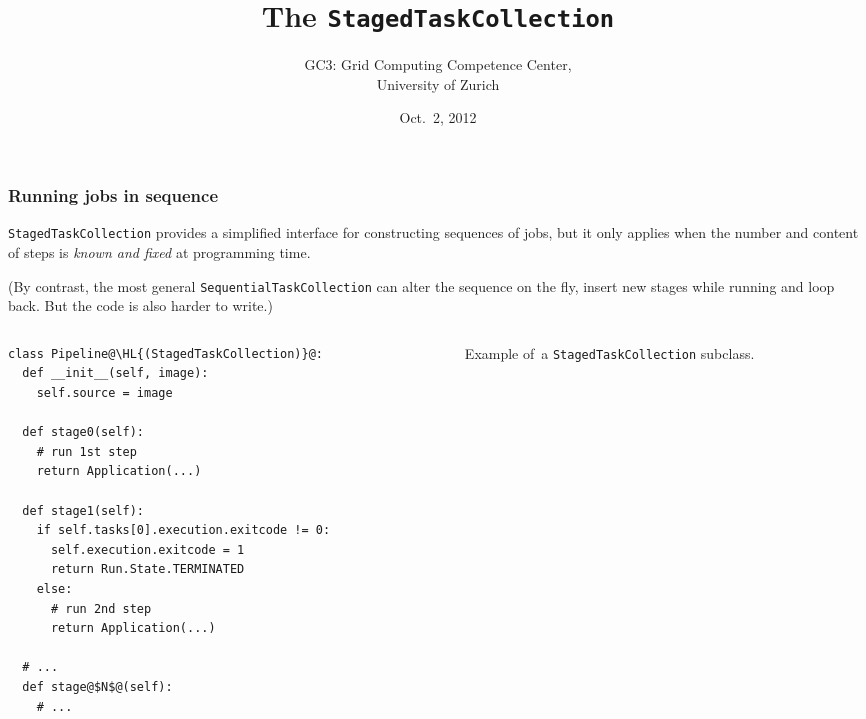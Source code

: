 \documentclass[english,serif,mathserif,xcolor=pdftex,dvipsnames,table]{beamer}
\title{%
  The \texttt{StagedTaskCollection}
}
\author[Riccardo Murri]{%
  GC3: Grid Computing Competence Center, \\
  University of Zurich
}
\date{Oct.~2, 2012}
\begin{document}
\maketitle


\begin{frame}[fragile]
  \frametitle{Running jobs in sequence}

  \texttt{StagedTaskCollection} provides a simplified interface for
  constructing sequences of jobs, but it only applies when the number
  and content of steps is \emph{known and fixed} at programming time.

  \+ 
  (By contrast, the most general \texttt{SequentialTaskCollection}
  can alter the sequence on the fly, insert new stages while running
  and loop back. But the code is also harder to write.)
\end{frame}


\begin{frame}[fragile]
  \begin{columns}[t]
    \begin{column}{0.6\textwidth}
      \begin{lstlisting}
class Pipeline@\HL{(StagedTaskCollection)}@:
  def __init__(self, image):
    self.source = image

  def stage0(self):
    # run 1st step
    return Application(...)

  def stage1(self):
    if self.tasks[0].execution.exitcode != 0:
      self.execution.exitcode = 1
      return Run.State.TERMINATED
    else:
      # run 2nd step
      return Application(...)

  # ...
  def stage@$N$@(self):
    # ...
      \end{lstlisting}
    \end{column}
    \begin{column}{0.4\textwidth}
      \raggedleft

      \+\+
      Example of~a \texttt{StagedTaskCollection}
      subclass.
    \end{column}
  \end{columns}
\end{frame}
\end{document}
